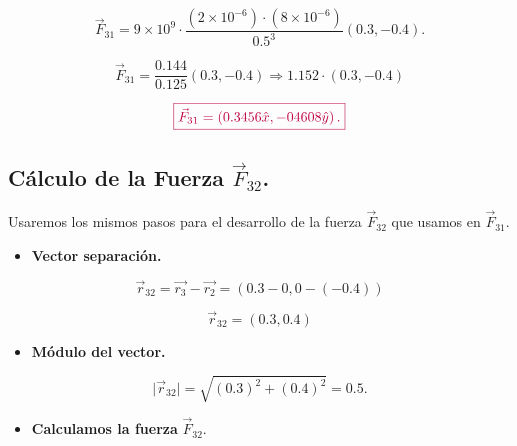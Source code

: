 \documentclass[a4paper,12pt]{article} %
\begin{document}
\[\vec{F}_{31} = 9 \times 10^9 \cdot \frac{ \left( 2 \times 10^{-6} \right)  \cdot \left( 8 \times 10^{-6} \right) }{ 0.5^3} \left( 0.3 , -0.4 \right).\]

\[\vec{F}_{31} = \frac{0.144}{0.125} \left( 0.3 , -0.4 \right)  \Rightarrow 1.152 \cdot \left( 0.3 , -0.4 \right) \]

\vspace{\baselineskip}

\[ \textcolor{purple}{\boxed{\vec{F}_{31}= \left( 0.3456 \hat{x} , -04608 \hat{y}\right).}} \]

\subsection{Cálculo de la Fuerza \(\vec{F}_{32}\).}

\vspace{\baselineskip}

\begin{justify}
	Usaremos los mismos pasos para el desarrollo de la fuerza \(\vec{F}_{32}\) que usamos en \(\vec{F}_{31}\).
\end{justify}

\vspace{\baselineskip}

\begin{justify}
	\begin{itemize}
		\item \textbf{Vector separación.}
	\end{itemize}
\end{justify}

\[ \vec{r}_{32} = \vec{r_3} - \vec{r_2} = \left( 0.3 - 0 , 0 - \left( - 0.4\right) \right)\]

\[ \vec{r}_{32} = (0.3 , 0.4) \]

\vspace{\baselineskip}

\begin{justify}
	\begin{itemize}
		\item \textbf{Módulo del vector.}
	\end{itemize}
\end{justify}

\[ \vert \vec{r}_{32} \vert  = \sqrt{(0.3)^2 + (0.4)^2} = 0.5. \]

\vspace{\baselineskip}

\begin{justify}
	\begin{itemize}
		\item \textbf{Calculamos la fuerza} \(\vec{F}_{32}\).
	\end{itemize}
\end{justify}
\end{document}
